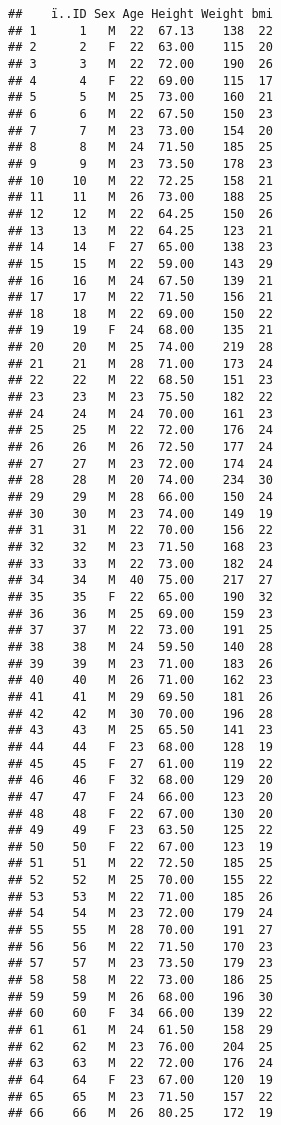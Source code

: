 \documentclass[
]{article}
\begin{document}
\begin{verbatim}
##    ï..ID Sex Age Height Weight bmi
## 1      1   M  22  67.13    138  22
## 2      2   F  22  63.00    115  20
## 3      3   M  22  72.00    190  26
## 4      4   F  22  69.00    115  17
## 5      5   M  25  73.00    160  21
## 6      6   M  22  67.50    150  23
## 7      7   M  23  73.00    154  20
## 8      8   M  24  71.50    185  25
## 9      9   M  23  73.50    178  23
## 10    10   M  22  72.25    158  21
## 11    11   M  26  73.00    188  25
## 12    12   M  22  64.25    150  26
## 13    13   M  22  64.25    123  21
## 14    14   F  27  65.00    138  23
## 15    15   M  22  59.00    143  29
## 16    16   M  24  67.50    139  21
## 17    17   M  22  71.50    156  21
## 18    18   M  22  69.00    150  22
## 19    19   F  24  68.00    135  21
## 20    20   M  25  74.00    219  28
## 21    21   M  28  71.00    173  24
## 22    22   M  22  68.50    151  23
## 23    23   M  23  75.50    182  22
## 24    24   M  24  70.00    161  23
## 25    25   M  22  72.00    176  24
## 26    26   M  26  72.50    177  24
## 27    27   M  23  72.00    174  24
## 28    28   M  20  74.00    234  30
## 29    29   M  28  66.00    150  24
## 30    30   M  23  74.00    149  19
## 31    31   M  22  70.00    156  22
## 32    32   M  23  71.50    168  23
## 33    33   M  22  73.00    182  24
## 34    34   M  40  75.00    217  27
## 35    35   F  22  65.00    190  32
## 36    36   M  25  69.00    159  23
## 37    37   M  22  73.00    191  25
## 38    38   M  24  59.50    140  28
## 39    39   M  23  71.00    183  26
## 40    40   M  26  71.00    162  23
## 41    41   M  29  69.50    181  26
## 42    42   M  30  70.00    196  28
## 43    43   M  25  65.50    141  23
## 44    44   F  23  68.00    128  19
## 45    45   F  27  61.00    119  22
## 46    46   F  32  68.00    129  20
## 47    47   F  24  66.00    123  20
## 48    48   F  22  67.00    130  20
## 49    49   F  23  63.50    125  22
## 50    50   F  22  67.00    123  19
## 51    51   M  22  72.50    185  25
## 52    52   M  25  70.00    155  22
## 53    53   M  22  71.00    185  26
## 54    54   M  23  72.00    179  24
## 55    55   M  28  70.00    191  27
## 56    56   M  22  71.50    170  23
## 57    57   M  23  73.50    179  23
## 58    58   M  22  73.00    186  25
## 59    59   M  26  68.00    196  30
## 60    60   F  34  66.00    139  22
## 61    61   M  24  61.50    158  29
## 62    62   M  23  76.00    204  25
## 63    63   M  22  72.00    176  24
## 64    64   F  23  67.00    120  19
## 65    65   M  23  71.50    157  22
## 66    66   M  26  80.25    172  19

\end{verbatim}
\end{document}
